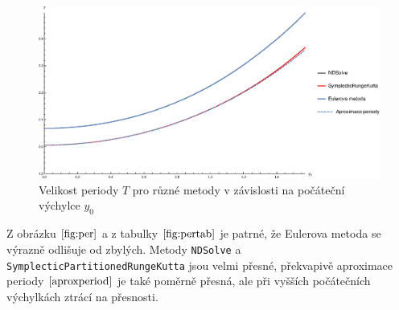 \begin{figure}[h]
  \centering
  \includegraphics[width=17cm]{figures/PER2.eps}
  \caption{Velikost periody $T$ pro různé metody v závislosti na počáteční výchylce $y_{0}$}
  \label{fig:per}
\end{figure}

Z obrázku $\eqref{fig:per}$ a z tabulky $\eqref{fig:pertab}$ je patrné, že Eulerova metoda se výrazně odlišuje od zbylých. Metody \texttt{NDSolve} a \texttt{SymplecticPartitionedRungeKutta} jsou velmi přesné, překvapivě aproximace periody $\eqref{aproxperiod}$ je také poměrně přesná, ale při vyšších počátečních výchylkách ztrácí na přesnosti.



